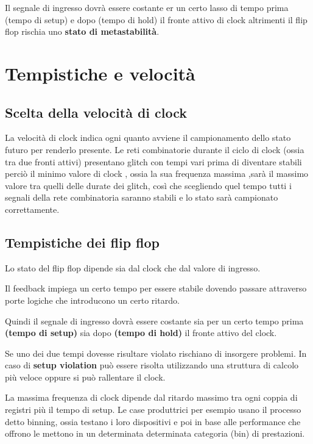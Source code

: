 \documentclass[a4paper]{book}
\begin{document}
Il segnale di ingresso dovrà essere costante er un certo lasso di tempo prima (tempo di setup) e dopo (tempo di hold) il fronte attivo di clock altrimenti il flip flop rischia uno \textbf{stato di metastabilità}.


\section{Tempistiche e velocità}
\subsection*{Scelta della velocità di clock}

La velocità di clock indica ogni quanto avviene il campionamento dello stato futuro per renderlo presente.
Le reti combinatorie durante il ciclo di clock (ossia tra due fronti attivi) presentano glitch con tempi vari prima di diventare stabili perciò il minimo valore di clock , ossia la sua frequenza massima ,sarà il massimo valore tra quelli delle durate dei glitch, così che scegliendo quel tempo tutti i segnali della rete combinatoria saranno stabili e lo stato sarà campionato correttamente.

\subsection*{Tempistiche dei flip flop}

Lo stato del flip flop dipende sia dal clock che dal valore di ingresso.

Il feedback impiega un certo tempo per essere stabile dovendo passare attraverso porte logiche che introducono un certo ritardo.

Quindi il segnale di ingresso dovrà essere costante sia per un certo tempo prima \textbf{(tempo di setup)} sia dopo \textbf{(tempo di hold)} il fronte attivo del clock.

Se uno dei due tempi dovesse risultare violato rischiano di insorgere problemi.
In caso di \textbf{setup violation} può essere risolta utilizzando una struttura di calcolo più veloce oppure si può rallentare il clock.

La massima frequenza di clock dipende dal ritardo massimo tra ogni coppia di registri più il tempo di setup.\vspace{\baselineskip}
Le case produttrici per esempio usano il processo detto binning, ossia testano i loro dispositivi e poi in base alle performance che offrono le mettono in un determinata determinata categoria (bin) di prestazioni.
\end{document}
